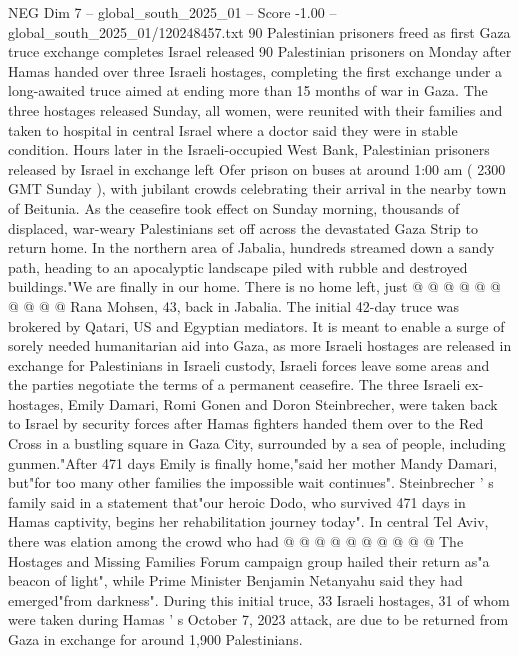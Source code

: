 \begin{textsample}{NEG Dim 7 – global\_south\_2025\_01 – Score -1.00 – global\_south\_2025\_01/120248457.txt}  \label{ex:f7_neg_110}
90 Palestinian prisoners freed as first Gaza truce exchange completes Israel released 90 Palestinian prisoners on Monday after Hamas handed over three Israeli hostages, completing the first exchange under a long-awaited truce aimed at ending more than 15 months of war in Gaza.
The three hostages released Sunday, all women, were reunited with their families and taken to hospital in central Israel where a doctor said they were in stable condition.
Hours later in the Israeli-occupied West Bank, Palestinian prisoners released by Israel in exchange left Ofer prison on buses at around 1:00 am ( 2300 GMT Sunday ), with jubilant crowds celebrating their arrival in the nearby town of Beitunia.
As the ceasefire took effect on Sunday morning, thousands of displaced, war-weary Palestinians set off across the devastated Gaza Strip to return home.
In the northern area of Jabalia, hundreds streamed down a sandy path, heading to an apocalyptic landscape piled with rubble and destroyed buildings."We are finally in our home.
There is no home left, just @ @ @ @ @ @ @ @ @ @ Rana Mohsen, 43, back in Jabalia.
The initial 42-day truce was brokered by Qatari, US and Egyptian mediators.
It is meant to enable a surge of sorely needed humanitarian aid into Gaza, as more Israeli hostages are released in exchange for Palestinians in Israeli custody, Israeli forces leave some areas and the parties negotiate the terms of a permanent ceasefire.
The three Israeli ex-hostages, Emily Damari, Romi Gonen and Doron Steinbrecher, were taken back to Israel by security forces after Hamas fighters handed them over to the Red Cross in a bustling square in Gaza City, surrounded by a sea of people, including gunmen."After 471 days Emily is finally home,"said her mother Mandy Damari, but"for too many other families the impossible wait continues".
Steinbrecher ' s family said in a statement that"our heroic Dodo, who survived 471 days in Hamas captivity, begins her rehabilitation journey today".
In central Tel Aviv, there was elation among the crowd who had @ @ @ @ @ @ @ @ @ @ The Hostages and Missing Families Forum campaign group hailed their return as"a beacon of light", while Prime Minister Benjamin Netanyahu said they had emerged"from darkness".
During this initial truce, 33 Israeli hostages, 31 of whom were taken during Hamas ' s October 7, 2023 attack, are due to be returned from Gaza in exchange for around 1,900 Palestinians.

\end{textsample}
